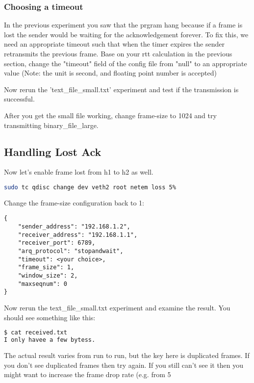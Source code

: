 \documentclass[11pt]{article}
\begin{document}
\subsubsection {Choosing a timeout}
In the previous experiment you saw that the prgram hang because if a frame is lost the sender would be waiting for the acknowledgement forever. To fix this, we need an appropriate timeout such that when the timer expires the sender retransmits the previous frame. Base on your rtt calculation in the previous section, change the "timeout" field of the config file from "null" to an appropriate value (Note: the unit is second, and floating point number is accepted)


\noindent Now rerun the 'text\_file\_small.txt' experiment and test if the transmission is successful.

\noindent After you get the small file working, change frame-size to 1024 and try transmitting binary\_file\_large.


\subsection {Handling Lost Ack}
Now let's enable frame lost from h1 to h2 as well.
\begin{lstlisting}[language=bash]
sudo tc qdisc change dev veth2 root netem loss 5%
\end{lstlisting}

Change the frame-size configuration back to 1:
\begin{lstlisting}[caption={Configuration For Large File}]
{
    "sender_address": "192.168.1.2",
    "receiver_address": "192.168.1.1",
    "receiver_port": 6789,
    "arq_protocol": "stopandwait",
    "timeout": <your choice>,
    "frame_size": 1,
    "window_size": 2,
    "maxseqnum": 0
}
\end{lstlisting}
Now rerun the text\_file\_small.txt experiment and examine the result. You should see something like this:

\begin{lstlisting}[language=bash]
$ cat received.txt
I only havee a few bytess.
\end{lstlisting}
The actual result varies from run to run, but the key here is duplicated frames. If you don't see duplicated frames then try again. If you still can't see it then you might want to increase the frame drop rate (e.g. from 5%
\end{document}

